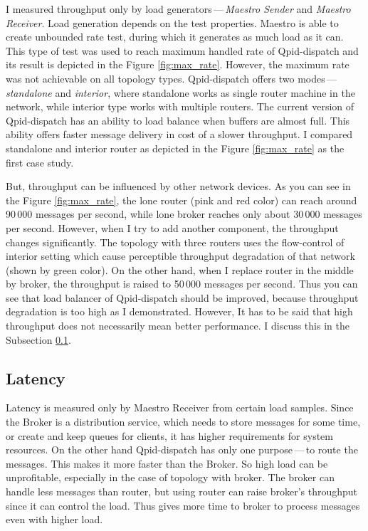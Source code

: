 I measured throughput only by load generators\,---\,\emph{Maes\-tro Sender} and \emph{Maestro Receiver}. Load generation depends on the test properties. Maestro is able to create unbounded rate test, during which it generates as much load as it can. This type of test was used to reach maximum handled rate of Qpid-dispatch and its result is depicted in the Figure \ref{fig:max_rate}. However, the maximum rate was not achievable on all topology types. Qpid-dispatch offers two modes\,---\,\emph{standalone} and \emph{interior}, where standalone works as single router machine in the network, while interior type works with multiple routers. The current version of Qpid-dispatch has an ability to load balance when buffers are almost full. This ability offers faster message delivery in cost of a slower throughput. I compared standalone and interior router as depicted in the Figure \ref{fig:max_rate} as the first case study.

But, throughput can be influenced by other network devices. As you can see in the Figure \ref{fig:max_rate}, the lone router (pink and red color) can reach around 90\,000 messages per second, while lone broker reaches only about 30\,000 messages per second. However, when I try to add another component, the throughput changes significantly. The topology with three routers uses the flow-control of interior setting which cause perceptible throughput degradation of that network (shown by green color). On the other hand, when I replace router in the middle by broker, the throughput is raised to 50\,000 messages per second. Thus you can see that load balancer of Qpid-dispatch should be improved, because throughput degradation is too high as I demonstrated. However, It has to be said that high throughput does not necessarily mean better performance. I discuss this in the Subsection \ref{Latency}.

\subsection{Latency}
\label{Latency}
Latency is measured only by Maestro Receiver from certain load samples. Since the Broker is a distribution service, which needs to store messages for some time, or create and keep queues for clients, it has higher requirements for system resources. On the other hand Qpid-dispatch has only one purpose\,---\,to route the messages. This makes it more faster than the Broker. So high load can be unprofitable, especially in the case of topology with broker. The broker can handle less messages than router, but using router can raise broker's throughput since it can control the load. Thus gives more time to broker to process messages even with higher load.

